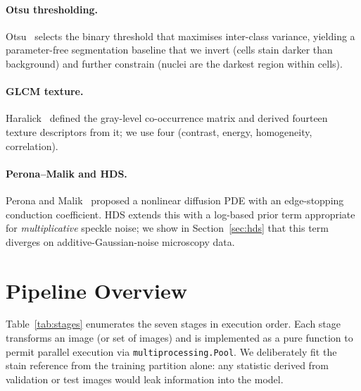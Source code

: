 \documentclass[conference,10pt]{IEEEtran}
\begin{document}
\paragraph{Otsu thresholding.} Otsu~\cite{otsu1979threshold} selects the binary threshold that maximises inter-class variance, yielding a parameter-free segmentation baseline that we invert (cells stain darker than background) and further constrain (nuclei are the darkest region within cells).

\paragraph{GLCM texture.} Haralick~\cite{haralick1973textural} defined the gray-level co-occurrence matrix and derived fourteen texture descriptors from it; we use four (contrast, energy, homogeneity, correlation).

\paragraph{Perona--Malik and HDS.} Perona and Malik~\cite{perona1990scale} proposed a nonlinear diffusion PDE with an edge-stopping conduction coefficient. HDS extends this with a log-based prior term appropriate for \emph{multiplicative} speckle noise; we show in Section~\ref{sec:hds} that this term diverges on additive-Gaussian-noise microscopy data.

\section{Pipeline Overview}
\label{sec:overview}

Table~\ref{tab:stages} enumerates the seven stages in execution order. Each stage transforms an image (or set of images) and is implemented as a pure function to permit parallel execution via \texttt{multiprocessing.Pool}. We deliberately fit the stain reference from the training partition alone: any statistic derived from validation or test images would leak information into the model.
\end{document}
